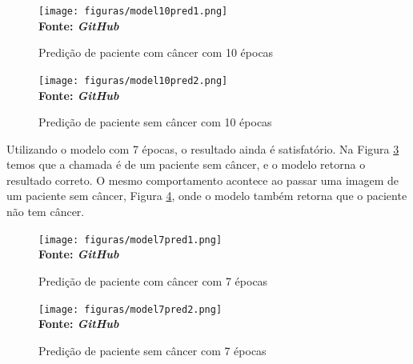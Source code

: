 \begin{figure}[ht]
 	\centering	
 	\caption[\hspace{0.1cm}Grade Computacional.]{Predição de paciente com câncer com 10 épocas}
 	\vspace{-0.4cm}
 	\texttt{[image: figuras/model10pred1.png]}
 	\captionsetup{justification=centering}
	\vspace{-0.2cm}
     \\\textbf{\footnotesize Fonte: \textit{GitHub}}
	\label{fig:predicao1}
\end{figure}

\begin{figure}[ht]
 	\centering	
 	\caption[\hspace{0.1cm}Grade Computacional.]{Predição de paciente sem câncer com 10 épocas}
 	\vspace{-0.4cm}
 	\texttt{[image: figuras/model10pred2.png]}
 	\captionsetup{justification=centering}
	\vspace{-0.2cm}
     \\\textbf{\footnotesize Fonte: \textit{GitHub}}
	\label{fig:predicao2}
\end{figure}


Utilizando o modelo com 7 épocas, o resultado ainda é satisfatório. Na Figura \ref{fig:predicao3} temos que a chamada é de um paciente sem câncer, e o modelo retorna o resultado correto. O mesmo comportamento acontece ao passar uma imagem de um paciente sem câncer, Figura \ref{fig:predicao4}, onde o modelo também retorna que o paciente não tem câncer.

\begin{figure}[ht]
 	\centering	
 	\caption[\hspace{0.1cm}Grade Computacional.]{Predição de paciente com câncer com 7 épocas}
 	\vspace{-0.4cm}
 	\texttt{[image: figuras/model7pred1.png]}
 	\captionsetup{justification=centering}
	\vspace{-0.2cm}
     \\\textbf{\footnotesize Fonte: \textit{GitHub}}
	\label{fig:predicao3}
\end{figure}

\begin{figure}[ht]
 	\centering	
 	\caption[\hspace{0.1cm}Grade Computacional.]{Predição de paciente sem câncer com 7 épocas}
 	\vspace{-0.4cm}
 	\texttt{[image: figuras/model7pred2.png]}
 	\captionsetup{justification=centering}
	\vspace{-0.2cm}
     \\\textbf{\footnotesize Fonte: \textit{GitHub}}
	\label{fig:predicao4}
\end{figure}


